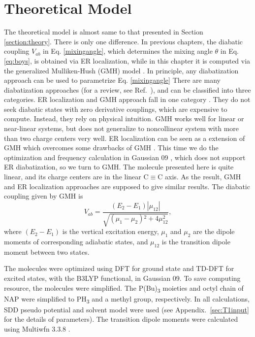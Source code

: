 \section{Theoretical Model} %
The theoretical model is almost same to that presented in Section \ref{section:theory}. There is only one difference. In previous chapters, the diabatic coupling $V_{ab}$ in Eq. \ref{mixingangle}, which determines the mixing angle $\theta$ in Eq. \ref{eq:boys}, is obtained via ER localization, while in this chapter it is computed via the generalized Mulliken-Hush (GMH) model \cite{cave1996generalization,cave1997calculation}. In principle, any diabatization approach can be used to parametrize Eq. \ref{mixingangle} There are many diabatization approaches (for a review, see Ref.~\cite{domcke2004conical}), and can be classified into three categories. ER localization and GMH approach fall in one category \cite{subotnik2008constructing,subotnik2009initial}. They do not seek diabatic states with zero derivative couplings, which are expensive to compute. Instead, they rely on physical intuition. GMH works well for linear or near-linear systems, but does not generalize to noncollinear system with more than two charge centers very well. ER localization can be seen as a extension of GMH which overcomes some drawbacks of GMH \cite{subotnik2009initial}. This time we do the optimization and frequency calculation in Gaussian 09 \cite{g09}, which does not support ER diabatization, so we turn to GMH. The molecule presented here is quite linear, and its charge centers are in the linear C$\equiv$C axis. As the result, GMH and ER localization approaches are supposed to give similar results. The diabatic coupling given by GMH is
$$V_{ab}=\frac{\left(E_2-E_1\right) \left|\mu _{12}\right|}{\sqrt{\left(\mu _1-\mu _2\right){}^2+4 \mu _{12}^2}},$$
where $\left(E_2-E_1\right)$ is the vertical excitation energy, $\mu _1$ and $\mu _2$ are the dipole moments of corresponding adiabatic states, and $\mu _{12}$ is the transition dipole moment between two states.

The molecules were optimized using DFT for ground state and TD-DFT for excited states, with the B3LYP functional, in Gaussian 09. To save computing resource, the molecules were simplified. The P(Bu)\textsubscript{3} moieties and octyl chain of NAP were simplified to PH\textsubscript{3} and a methyl group, respectively. In all calculations, SDD pseudo potential and solvent model were used (see Appendix.~\ref{sec:T1input} for the details of parameters). The transition dipole moments were calculated using Multiwfn 3.3.8 \cite{lu2012multiwfn}.


